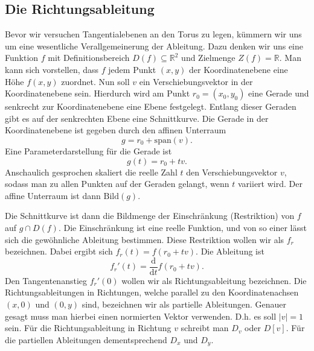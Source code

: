 \documentclass[a4paper,12pt,fleqn]{article}
\begin{document}
\subsection{Die Richtungsableitung}
Bevor wir versuchen Tangentialebenen an den Torus zu legen, kümmern
wir uns um eine wesentliche Verallgemeinerung der Ableitung. Dazu
denken wir uns eine Funktion \(f\) mit Definitionsbereich
\(D(f)\subseteq\mathbb R^2\) und Zielmenge \(Z(f)=\mathbb R\).
Man kann sich vorstellen, dass \(f\) jedem Punkt \((x,y)\) der
Koordinatenebene eine Höhe \(f(x,y)\) zuordnet. Nun soll \(v\) ein
Verschiebungsvektor in der Koordinatenebene sein. Hierdurch
wird am Punkt \(r_0=(x_0,y_0)\) eine Gerade und senkrecht zur
Koordinatenebene eine Ebene festgelegt. Entlang dieser
Geraden gibt es auf der senkrechten Ebene eine Schnittkurve.
Die Gerade in der Koordinatenebene ist gegeben durch
den affinen Unterraum
\begin{equation}
g = r_0+\mathrm{span}(v).
\end{equation}
Eine Parameterdarstellung für die Gerade ist
\begin{equation}
g(t) = r_0+tv.
\end{equation}
Anschaulich gesprochen skaliert die reelle Zahl \(t\) den
Verschiebungsvektor \(v\), sodass man zu allen Punkten auf der
Geraden gelangt, wenn \(t\) variiert wird.
Der affine Unterraum ist dann \(\mathrm{Bild}(g)\).

Die Schnittkurve ist dann die Bildmenge der Einschränkung
(Restriktion) von \(f\) auf \(g\cap D(f)\). Die Einschränkung
ist eine reelle Funktion, und von so einer lässt sich die
gewöhnliche Ableitung bestimmen. Diese Restriktion wollen wir
als \(f_r\) bezeichnen. Dabei ergibt sich
\(f_r(t) = f(r_0+tv)\).
Die Ableitung ist
\begin{equation}\label{Restriktion}
f_r'(t) = \frac{\mathrm d}{\mathrm dt} f(r_0+tv).
\end{equation}
Den Tangentenanstieg \(f_r'(0)\) wollen wir als Richtungsableitung
bezeichnen. Die Richtungsableitungen in Richtungen, welche
parallel zu den Koordinatenachsen \((x,0)\) und \((0,y)\) sind,
bezeichnen wir als partielle Ableitungen. Genauer gesagt muss man
hierbei einen normierten Vektor verwenden. D.h. es soll \(|v|=1\) sein.
Für die Richtungsableitung in Richtung \(v\) schreibt man \(D_v\) oder
\(D[v]\). Für die partiellen Ableitungen dementsprechend
\(D_x\) und \(D_y\).
\end{document}

